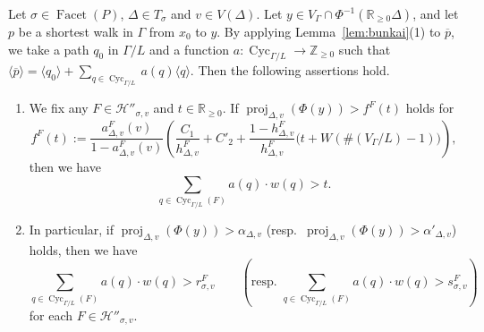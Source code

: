 \begin{lem}\label{lem:rs}
Let $\sigma \in \operatorname{Facet}(P)$, $\Delta \in T_{\sigma}$ and $v \in V(\Delta)$. 
Let $y \in V_{\Gamma} \cap \Phi^{-1} (\mathbb{R}_{\ge 0} \Delta)$, 
and let $p$ be a shortest walk in $\Gamma$ from $x_0$ to $y$. 
By applying Lemma~\ref{lem:bunkai}(1) to $\overline{p}$, 
we take a path $q_0$ in $\Gamma /L$ and a function $a : \operatorname{Cyc}_{\Gamma /L} \to \mathbb{Z}_{\ge 0}$ 
such that $\langle \overline{p} \rangle = \langle q_0 \rangle + \sum _{q \in \operatorname{Cyc}_{\Gamma /L}} a(q) \langle q \rangle$. 
Then the following assertions hold. 

\begin{enumerate}
\item
We fix any $F \in \mathcal{H}'' _{\sigma, v}$ and $t \in \mathbb{R}_{\ge 0}$. 
If $\operatorname{proj}_{\Delta, v} (\Phi(y)) > f^F(t)$ holds for
\[
f^F(t) := \frac{a^{F} _{\Delta, v} (v)}{1-a^{F} _{\Delta, v} (v)}
\left( \frac{C_1}{h^F_{\Delta, v}} + C'_2 + \frac{1-h^F_{\Delta, v}}{h^F_{\Delta, v}} \bigl( t + W ( \#(V_{\Gamma}/L) -1) \bigr) \right), 
\]
then we have
\[
\sum _{q \in \operatorname{Cyc}_{\Gamma /L}(F)} a(q) \cdot w(q) > t. 
\]

\item
In particular, if $\operatorname{proj}_{\Delta, v} (\Phi(y)) > \alpha _{\Delta, v}$ (resp.\ $\operatorname{proj}_{\Delta, v} (\Phi(y)) > \alpha' _{\Delta, v}$) holds, then we have 
\[
\sum _{q \in \operatorname{Cyc}_{\Gamma /L}(F)} a(q) \cdot w(q) > r^{F} _{\sigma, v} \qquad
(\text{resp.\ $\sum _{q \in \operatorname{Cyc}_{\Gamma /L}(F)} a(q) \cdot w(q) > s^{F} _{\sigma, v}$})
\]
for each $F \in \mathcal{H}'' _{\sigma, v}$. 
\end{enumerate}
\end{lem}
